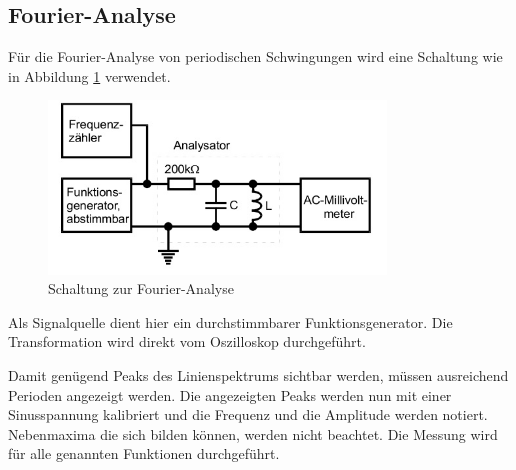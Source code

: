 \subsection{Fourier-Analyse}
Für die Fourier-Analyse von periodischen Schwingungen wird eine Schaltung wie in
Abbildung \ref{fig:ana} verwendet.
\begin{figure}[h]
  \centering
  \includegraphics[width=0.8\textwidth]{bilder/analyse.jpg}
  \caption{Schaltung zur Fourier-Analyse\,\cite{351}}
  \label{fig:ana}
\end{figure}
Als Signalquelle dient hier ein durchstimmbarer Funktionsgenerator. Die
Transformation wird direkt vom Oszilloskop durchgeführt.

Damit genügend Peaks des Linienspektrums sichtbar werden, müssen ausreichend
Perioden angezeigt werden. Die angezeigten Peaks werden nun mit einer
Sinusspannung kalibriert und die Frequenz und die Amplitude werden notiert.
Nebenmaxima die sich bilden können, werden nicht beachtet. Die Messung wird für
alle genannten Funktionen durchgeführt.

